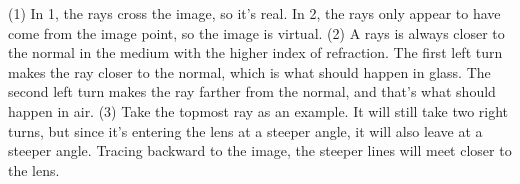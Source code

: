 (1) In 1, the rays cross the image, so it's real. In 2, the rays only appear to have come from the
image point, so the image is virtual.
(2) A rays is always closer to the normal in the medium with the higher index of refraction. The first
left turn makes the ray closer to the normal, which is what should happen in glass. The second left
turn makes the ray farther from the normal, and that's what should happen in air.
(3) Take the topmost ray as an example. It will still take two right turns, but since it's entering
the lens at a steeper angle, it will also leave at a steeper angle. Tracing backward to the image,
the steeper lines will meet closer to the lens.



